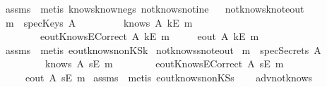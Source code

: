 \begin{isabellebody}
\isadelimproof
\endisadelimproof
\isatagproof
{}\isamarkupfalse \ assms\ \isamarkupfalse \ {\isacharparenleft}metis\ knows{}know{\isacharunderscore}neg{\isacharunderscore}s\ not{\isacharunderscore}know{\isacharunderscore}s{\isacharunderscore}not{\isacharunderscore}ine{\isacharparenright}\endisatagproof
{\isafoldproof}\isadelimproof
\ \isanewline
\endisadelimproof
\isanewline
{}\isamarkupfalse \ not{\isacharunderscore}knows{\isacharunderscore}k{\isacharunderscore}not{\isacharunderscore}eout{\isacharcolon}\isanewline
{}\ {\isachardoublequoteopen}m\ {\isasymnotin}\ specKeys\ A{\isachardoublequoteclose}\isanewline
\ \ \ \ \ \ \ \ {\isachardoublequoteopen}{\isasymnot}\ knows\ A\ {\isacharbrackleft}kE\ m{\isacharbrackright}{\isachardoublequoteclose}\isanewline
\ \ \ \ \ \ \ \ {\isachardoublequoteopen}eoutKnowsECorrect\ A\ {\isacharparenleft}kE\ m{\isacharparenright}{\isachardoublequoteclose}\isanewline
{}\ \ \ \ {\isachardoublequoteopen}{\isasymnot}\ eout\ A\ {\isacharparenleft}kE\ m{\isacharparenright}{\isachardoublequoteclose}\isanewline
\isadelimproof
\endisadelimproof
\isatagproof
{}\isamarkupfalse \ assms\ \isamarkupfalse \ {\isacharparenleft}metis\ eout{\isacharunderscore}knows{\isacharunderscore}nonKS{\isacharunderscore}k{\isacharparenright}\endisatagproof
{\isafoldproof}\isadelimproof
\isanewline
\endisadelimproof
\isanewline
{}\isamarkupfalse \ not{\isacharunderscore}knows{\isacharunderscore}s{\isacharunderscore}not{\isacharunderscore}eout{\isacharcolon}\isanewline
{}\ {\isachardoublequoteopen}m\ {\isasymnotin}\ specSecrets\ A{\isachardoublequoteclose}\isanewline
\ \ \ \ \ \ \ \ {\isachardoublequoteopen}{\isasymnot}\ knows\ A\ {\isacharbrackleft}sE\ m{\isacharbrackright}{\isachardoublequoteclose}\isanewline
\ \ \ \ \ \ \ \ {\isachardoublequoteopen}eoutKnowsECorrect\ A\ {\isacharparenleft}sE\ m{\isacharparenright}{\isachardoublequoteclose}\isanewline
{}\ \ \ \ {\isachardoublequoteopen}{\isasymnot}\ eout\ A\ {\isacharparenleft}sE\ m{\isacharparenright}{\isachardoublequoteclose}\isanewline
\isadelimproof
\endisadelimproof
\isatagproof
{}\isamarkupfalse \ assms\ \isamarkupfalse \ {\isacharparenleft}metis\ eout{\isacharunderscore}knows{\isacharunderscore}nonKS{\isacharunderscore}s{\isacharparenright}\endisatagproof
{\isafoldproof}\isadelimproof
\ \isanewline
\endisadelimproof
\isanewline
{}\isamarkupfalse \ \ adv{\isacharunderscore}not{\isacharunderscore}knows{}{\isacharcolon}\isanewline

\end{isabellebody}
